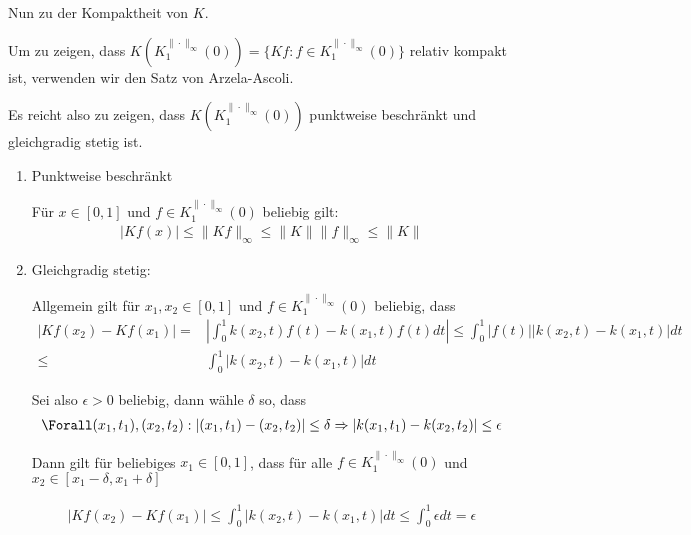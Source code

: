 \begin{solution}
Nun zu der Kompaktheit von $K$.

 Um zu zeigen, dass $K(K_{1}^{\|\cdot\|_{\infty}}(0)) = \{Kf : f \in K_{1}^{\|\cdot\|_{\infty}}(0)\}$ relativ kompakt ist, verwenden wir den Satz von Arzela-Ascoli.

 Es reicht also zu zeigen, dass $K(K_{1}^{\|\cdot\|_{\infty}}(0))$ punktweise beschränkt und gleichgradig stetig ist.

 \begin{enumerate}

 \item Punktweise beschränkt

 Für $x \in [0,1]$ und $f \in K_{1}^{\|\cdot\|_{\infty}}(0)$ beliebig gilt:
\begin{align*}
  |Kf(x)| \leq \|Kf\|_{\infty} \leq \|K\| \|f\|_{\infty} \leq \|K\|
\end{align*}

\item Gleichgradig stetig:

Allgemein gilt für $x_1, x_2 \in [0,1]$ und $f \in K_{1}^{\|\cdot\|_{\infty}}(0)$ beliebig, dass
\begin{align*}
  |Kf(x_2) - Kf(x_1)| =& | \int_{0}^{1} k(x_2,t)f(t) - k(x_1,t)f(t) dt| \leq \int_{0}^{1} |f(t)||k(x_2,t)- k(x_1,t)|dt \\
  \leq& \int_{0}^{1} |k(x_2,t)- k(x_1,t)|dt
\end{align*}

Sei also $\epsilon > 0$ beliebig, dann wähle $\delta$ so, dass
\begin{align*}
  \Forall (x_1,t_1),(x_2,t_2): | (x_1,t_1) - (x_2,t_2)| \leq \delta \Rightarrow | k(x_1,t_1) - k(x_2,t_2)| \leq \epsilon
\end{align*}

Dann gilt für beliebiges $x_1 \in [0,1]$, dass für alle $f \in K_{1}^{\|\cdot\|_{\infty}}(0)$ und $x_2 \in [x_1-\delta,x_1+\delta]$

\begin{align*}
  |Kf(x_2) - Kf(x_1)| \leq \int_{0}^{1} |k(x_2,t)- k(x_1,t)|dt \leq \int_{0}^{1} \epsilon dt = \epsilon
\end{align*}

 \end{enumerate}


\end{solution}
